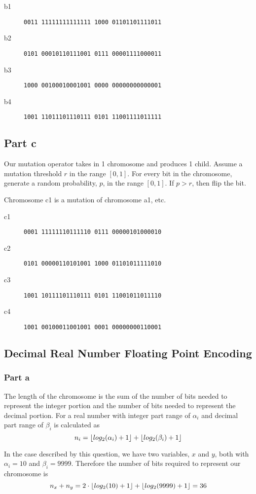\documentclass[a4paper]{article}
\DeclarePairedDelimiter\floor{\lfloor}{\rfloor}
\begin{document}
\begin{description}
\item[b1] \texttt{0011 11111111111111 1000 01101101111011}
\item[b2] \texttt{0101 00010110111001 0111 00001111000011}
\item[b3] \texttt{1000 00100010001001 0000 00000000000001}
\item[b4] \texttt{1001 11011101110111 0101 11001111011111}
\end{description}

\subsection{Part c}
Our mutation operator takes in 1 chromosome and produces 1 child. Assume a mutation threshold $r$ in the range $[0,1]$. For every bit in the chromosome, generate a random probability, $p$, in the range $[0,1]$. If $p > r$, then flip the bit.

Chromosome c1 is a mutation of chromosome a1, etc.

\begin{description}
\item[c1] \texttt{0001 11111110111110 0111 00000101000010}
\item[c2] \texttt{0101 00000110101001 1000 01101011111010}
\item[c3] \texttt{1001 10111101110111 0101 11001011011110}
\item[c4] \texttt{1001 00100011001001 0001 00000000110001}
\end{description}

\subsection{Decimal Real Number Floating Point Encoding}
\subsubsection{Part a}

The length of the chromosome is the sum of the number of bits needed to represent the integer portion and the number of bits needed to represent the decimal portion. For a real number with integer part range of $\alpha_i$ and decimal part range of $\beta_i$ is calculated as
$$n_i = \floor{log_2(\alpha_i) + 1} + \floor{log_2(\beta_i) + 1}$$

In the case described by this question, we have two variables, $x$ and $y$, both with $\alpha_i = 10$ and $\beta_i = 9999$. Therefore the number of bits required to represent our chromosome is
$$ n_x + n_y = 2 \cdot \floor{log_2(10) + 1} + \floor{log_2(9999) + 1} = 36 $$
\end{document}

